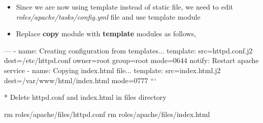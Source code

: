 \begin{itemize}
\item Since we are now using template instead of static file, we need to edit \emph{roles/apache/tasks/config.yml} file and use template module  
\item Replace \textbf{copy} module with \textbf{template} modules as follows,
\end{itemize}

\begin{code}
---
- name: Creating configuration from templates...
  template: src=httpd.conf.j2
            dest=/etc/httpd.conf
            owner=root group=root mode=0644
  notify: Restart apache service
- name: Copying index.html file...
  template: src=index.html.j2
        dest=/var/www/html/index.html
        mode=0777
```  

  * Delete httpd.conf and index.html in files directory   

\end{code}
  rm roles/apache/files/httpd.conf
  rm roles/apache/files/index.html

